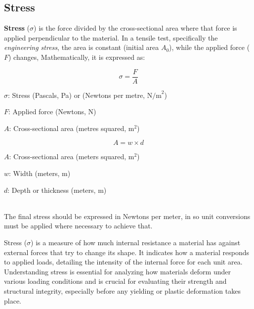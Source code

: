 \documentclass{article}
\newcommand{\wm}[1]{%
    \begin{minipage}{1\textwidth}
        #1
    \end{minipage}%
}
\begin{document}
     \subsection{Stress}
     \textbf{Stress} ($\sigma$) is the force divided by the cross-sectional area where that force is applied perpendicular to the material. In a tensile test, specifically the \textit{engineering stress}, the area is constant (initial area $A_0$), while the applied force ($F$) changes, Mathematically, it is expressed as:\\[8pt]
    \begin{minipage}{0.46\textwidth}
            \begin{equation}
                \sigma = \frac{F}{A}
                \label{eq:strain}
            \end{equation}
            \begin{itemize}[left=0pt,itemsep=-1mm]
            \wm{\item \(\sigma\): Stress (Pascals, Pa) or (Newtons per metre, \(\text{N/m}^2\))}
            \wm{\item \(F\): Applied force (Newtons, N)}
            \wm{\item \(A\): Cross-sectional area (metres squared, \(\text{m}^2\))}
            \end{itemize}
        \end{minipage}\hfill
        \begin{minipage}{0.47\textwidth}
            \begin{equation}
                A = w \times d
                \label{eq:csa}
            \end{equation}
            \begin{itemize}[left=0pt,itemsep=-1mm]
                \wm{\item \(A\): Cross-sectional area (meters squared, \(\text{m}^2\))}
                \wm{\item \(w\): Width (meters, \(\text{m}\))}
                \wm{\item \(d\): Depth or thickness (meters, \(\text{m}\))}            
            \end{itemize}
        \end{minipage}\\[8pt]
        The final stress should be expressed in Newtons per meter, in so unit conversions must be applied where necessary to achieve that.
        \newpage
        
        Stress ($\sigma$) is a measure of how much internal resistance a material has against external forces that try to change its shape. It indicates how a material responds to applied loads, detailing the intensity of the internal force for each unit area.\\[8pt]
        Understanding stress is essential for analyzing how materials deform under various loading conditions and is crucial for evaluating their strength and structural integrity, especially before any yielding or plastic deformation takes place.        
        
\end{document}

